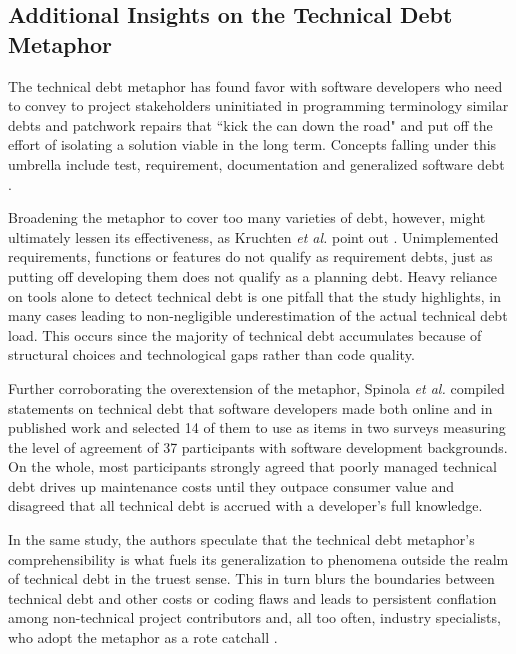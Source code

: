 \subsection{Additional Insights on the Technical Debt Metaphor}

The technical debt metaphor has found favor with software developers who need to convey to project stakeholders uninitiated in programming terminology similar debts and patchwork repairs that ``kick the can down the road" and put off the effort of isolating a solution viable in the long term. Concepts falling under this umbrella include test, requirement, documentation and generalized software debt \cite{sterling2010managing}.

Broadening the metaphor to cover too many varieties of debt, however, might ultimately lessen its effectiveness, as Kruchten \textit{et al.} point out \cite{Kruchten_td_IEEE}.  Unimplemented requirements, functions or features do not qualify as requirement debts, just as putting off developing them does not qualify as a planning debt. Heavy reliance on tools alone to detect technical debt is one pitfall that the study highlights, in many cases leading to non-negligible underestimation of the actual technical debt load. This occurs since the majority of technical debt accumulates because of structural choices and technological gaps rather than code quality.

Further corroborating the overextension of the metaphor, Spinola \textit{et al.} \cite{spinola2013investigating} compiled statements on technical debt that software developers made both online and in published work and selected 14 of them to use as items in two surveys measuring the level of agreement of 37 participants with software development backgrounds. On the whole, most participants strongly agreed that poorly managed technical debt drives up maintenance costs until they outpace consumer value and disagreed that all technical debt is accrued with a developer's full knowledge.

In the same study, the authors speculate that the technical debt metaphor's comprehensibility is what fuels its generalization to phenomena outside the realm of technical debt in the truest sense. This in turn blurs the boundaries between technical debt and other costs or coding flaws and leads to persistent conflation among non-technical project contributors and, all too often, industry specialists, who adopt the metaphor as a rote catchall \cite{spinola2013investigating}.

